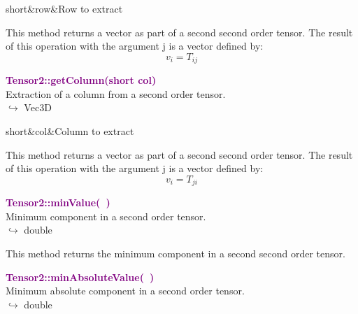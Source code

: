 \begin{tcolorbox}[width=\textwidth,myArgs,tabularx={ll|R},title=Arguments of Tensor2::getRow]
short&row&Row to extract
\end{tcolorbox}

This method returns a vector as part of a second second order tensor.
The result of this operation with the argument j is a vector defined by:
\begin{equation*}
v_{i} = T_{ij}
\end{equation*}

\textcolor{purple}{\textbf{Tensor2::getColumn(short col)}}\label{Tensor2::getColumn(short col)}\\
Extraction of a column from a second order tensor.\\ \hspace*{10mm}$\hookrightarrow$ Vec3D

\begin{tcolorbox}[width=\textwidth,myArgs,tabularx={ll|R},title=Arguments of Tensor2::getColumn]
short&col&Column to extract
\end{tcolorbox}

This method returns a vector as part of a second second order tensor.
The result of this operation with the argument j is a vector defined by:
\begin{equation*}
v_{i} = T_{ji}
\end{equation*}

\textcolor{purple}{\textbf{Tensor2::minValue(~)}}\label{Tensor2::minValue()}\\
Minimum component in a second order tensor.\\ \hspace*{10mm}$\hookrightarrow$ double

This method returns the minimum component in a second second order tensor.

\textcolor{purple}{\textbf{Tensor2::minAbsoluteValue(~)}}\label{Tensor2::minAbsoluteValue()}\\
Minimum absolute component in a second order tensor.\\ \hspace*{10mm}$\hookrightarrow$ double


